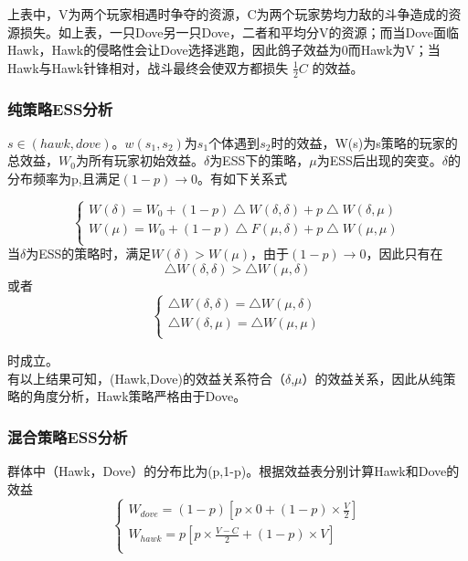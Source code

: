 \documentclass[12pt]{article}
\begin{document}
上表中，V为两个玩家相遇时争夺的资源，C为两个玩家势均力敌的斗争造成的资源损失。如上表，一只Dove另一只Dove，二者和平均分V的资源；而当Dove面临Hawk，Hawk的侵略性会让Dove选择逃跑，因此鸽子效益为0而Hawk为V；当Hawk与Hawk针锋相对，战斗最终会使双方都损失 $\frac{1}{2}C$ 的效益。
\subsubsection{纯策略ESS分析} 
$s\in(hawk,dove)$。$w(s_1,s_2)$为$s_1$个体遇到$s_2$时的效益，W(s)为s策略的玩家的总效益，$W_0$为所有玩家初始效益。$\delta$为ESS下的策略，$\mu$为ESS后出现的突变。$\delta$的分布频率为p,且满足$(1-p)\to0$。有如下关系式

\begin{displaymath}
\left\{
\begin{aligned}
W(\delta)=W_0+(1-p)\bigtriangleup W(\delta,\delta)+p\bigtriangleup W(\delta,\mu)\\
W(\mu)=W_0+(1-p)\bigtriangleup F(\mu,\delta)+p\bigtriangleup W(\mu,\mu)\\
\end{aligned}
\right.
\end{displaymath}
当$\delta$为ESS的策略时，满足$W(\delta)>W(\mu)$，由于$(1-p)\to0$，因此只有在
$$\bigtriangleup W(\delta,\delta)>\bigtriangleup W(\mu,\delta)$$
或者
\begin{displaymath}
\left\{
\begin{aligned}
\bigtriangleup W(\delta,\delta)=\bigtriangleup W(\mu,\delta) \\
\bigtriangleup W(\delta,\mu)=\bigtriangleup W(\mu,\mu)\\
\end{aligned}
\right.
\end{displaymath}

\noindent 时成立。\\

有以上结果可知，(Hawk,Dove)的效益关系符合（$\delta$,$\mu$）的效益关系，因此从纯策略的角度分析，Hawk策略严格由于Dove。

\subsubsection{混合策略ESS分析} 
群体中（Hawk，Dove）的分布比为(p,1-p)。根据效益表分别计算Hawk和Dove的效益
\begin{displaymath}
\left\{
\begin{aligned}
W_{dove}=(1-p)[p\times0+(1-p)\times\frac{V}{2}] \\
W_{hawk}=p[p\times\frac{V-C}{2}+(1-p)\times V]\\
\end{aligned}
\right.
\end{displaymath}
\end{document}

